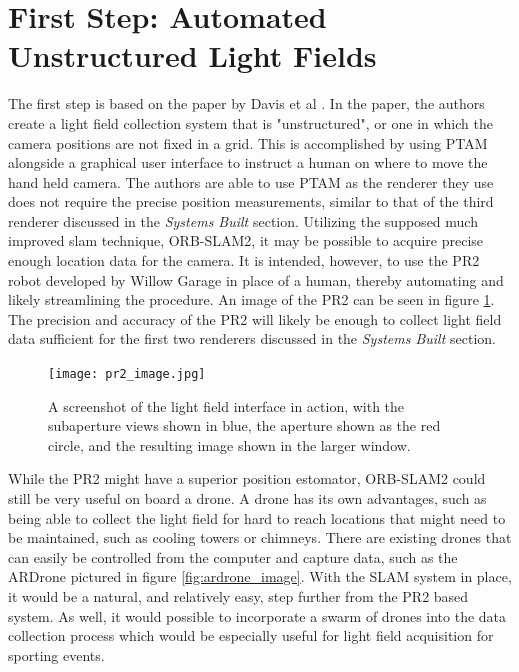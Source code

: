 \documentclass[12pt]{report}
\begin{document}
\section{First Step: Automated Unstructured Light Fields}
The first step is based on the paper by Davis et al \cite{Davis12}. In the paper, the authors create a light field collection system that is "unstructured", or one in which the camera positions are not fixed in a grid. This is accomplished by using PTAM alongside a graphical user interface to instruct a human on where to move the hand held camera. The authors are able to use PTAM as the renderer they use does not require the precise position measurements, similar to that of the third renderer discussed in the \emph{Systems Built} section. Utilizing the supposed much improved slam technique, ORB-SLAM2, it may be possible to acquire precise enough location data for the camera. It is intended, however, to use the PR2 robot developed by Willow Garage in place of a human, thereby automating and likely streamlining the procedure. An image of the PR2 can be seen in figure \ref{fig:pr2_image}. The precision and accuracy of the PR2 will likely be enough to collect light field data sufficient for the first two renderers discussed in the \emph{Systems Built} section.

\begin{figure}[!ht]
	\centering
	\texttt{[image: pr2\_image.jpg]}
	\caption{A screenshot of the light field interface in action, with the subaperture views shown in blue, the aperture shown as the red circle, and the resulting image shown in the larger window.}
	\label{fig:pr2_image}
\end{figure}
While the PR2 might have a superior position estomator, ORB-SLAM2 could still be very useful on board a drone. A drone has its own advantages, such as being able to collect the light field for hard to reach locations that might need to be maintained, such as cooling towers or chimneys. There are existing drones that can easily be controlled from the computer and capture data, such as the ARDrone pictured in figure \ref{fig:ardrone_image}. With the SLAM system in place, it would be a natural, and relatively easy, step further from the PR2 based system. As well, it would possible to incorporate a swarm of drones into the data collection process which would be especially useful for light field acquisition for sporting events.
\end{document}
